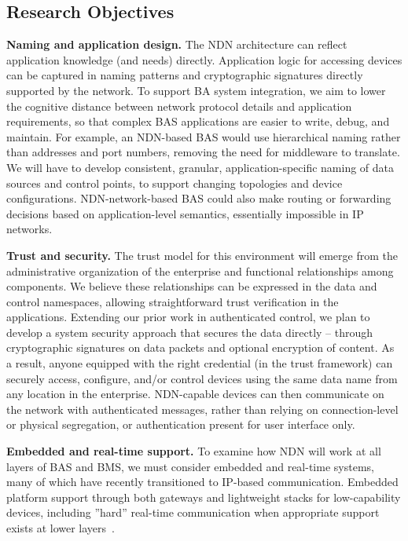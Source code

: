\subsection{Research Objectives} 

{\bf Naming and application design.} The NDN architecture can reflect application knowledge (and needs) directly. Application logic for accessing devices can be captured in naming patterns and cryptographic signatures directly supported by the network. To support BA system integration, we aim to lower the cognitive distance between network protocol details and application requirements, so that complex BAS applications are easier to write, debug, and maintain. For example, an NDN-based BAS would use hierarchical naming rather than addresses and port numbers, removing the need for middleware to translate.  We will have to develop
consistent, granular, application-specific naming of data sources and control points, to
support changing topologies and device configurations.  NDN-network-based BAS could also 
make routing or forwarding decisions based on application-level semantics, 
essentially impossible in IP networks.

{\bf Trust and security.} The trust model for this environment will emerge from the administrative organization of the enterprise and functional relationships among components.  We believe these relationships can be expressed in the data and control namespaces, allowing straightforward trust verification in the applications.  Extending our prior work in authenticated control, we plan to develop a system security approach that secures the data directly – through cryptographic signatures on data packets and optional encryption of content. As a result, anyone equipped with the right credential (in the trust framework) can securely access, configure, and/or control  devices using the same data name from any location in the enterprise. NDN-capable devices can then communicate on the network with authenticated messages, rather than relying on connection-level or physical segregation, or authentication present for user interface only.

{\bf Embedded and real-time support.}  To examine how NDN will work at all layers of BAS and BMS, we must consider embedded and real-time systems, many of which have recently transitioned to IP-based communication.  Embedded platform support through both gateways and lightweight stacks for low-capability devices, including ''hard'' real-time communication when appropriate support exists at lower 
layers~\cite{loeser2004low, skeie2006timeliness}.


